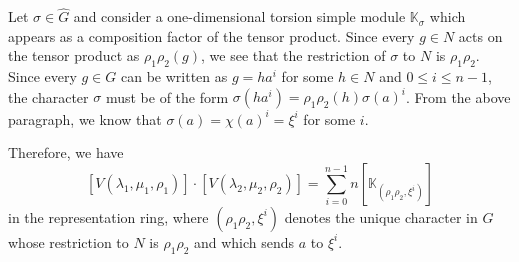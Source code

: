 \documentclass[11pt, twoside]{amsart}
\theoremstyle{definition}
\begin{document}
Let $\sigma \in \widehat{G}$ and consider a one-dimensional torsion simple module $\mathbb{K}_\sigma$ which appears as a composition factor of the tensor product. Since every $g \in N$ acts on the tensor product as $\rho_1 \rho_2(g)$, we see that the restriction of $\sigma$ to $N$ is $\rho_1 \rho_2$. Since every $g \in G$ can be written as $g = ha^i$ for some $h \in N$ and $0\le i \le n-1$, the character $\sigma$ must be of the form $\sigma(ha^i) = \rho_1 \rho_2(h)\sigma(a)^i$. From the above paragraph, we know that $\sigma(a) = \chi(a)^i = \xi^i$ for some $i$. 

Therefore, we have 
%
\[[V(\lambda_1, \mu_1, \rho_1)]\cdot[V(\lambda_2, \mu_2, \rho_2)] = \sum_{i = 0}^{n-1}n\left[\mathbb{K}_{(\rho_1 \rho_2, \xi^i)}\right]\]
%
in the representation ring, where $(\rho_1\rho_2, \xi^i)$ denotes the unique character in $G$ whose restriction to $N$ is $\rho_1\rho_2$ and which sends $a$ to $\xi^i$. 
\end{document}
